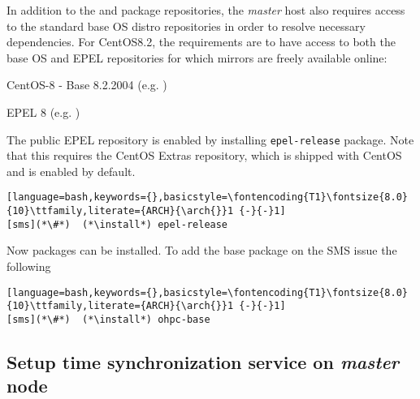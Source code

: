 \documentclass[letterpaper]{article}
\newcommand{\baseOS}{CentOS8.2}
\newcommand{\arch}{x86\_64}
\newcommand{\install}{yum -y install}
\begin{document}


In addition to the \OHPC{} and \xCAT{} package repositories, the {\em master} host also
requires access to the standard base OS distro repositories in order to resolve
necessary dependencies. For \baseOS{}, the requirements are to have access to
both the base OS and EPEL repositories for which mirrors are freely available online:

\begin{itemize*}
\item CentOS-8 - Base 8.2.2004
  (e.g. \href{http://mirror.centos.org/centos-8/8/BaseOS/x86\_64/os}
             {\color{blue}{http://mirror.centos.org/centos-8/8/BaseOS/x86\_64/os}} )
\item EPEL 8 (e.g. \href{http://download.fedoraproject.org/pub/epel/8/Everything/x86\_64}
                        {\color{blue}{http://download.fedoraproject.org/pub/epel/8/Everything/x86\_64}} )
\end{itemize*}

\noindent The public EPEL repository is enabled by installing
\texttt{epel-release} package. Note that this requires the CentOS Extras
repository, which is shipped with CentOS and is enabled by default.

\begin{lstlisting}[language=bash,keywords={},basicstyle=\fontencoding{T1}\fontsize{8.0}{10}\ttfamily,literate={ARCH}{\arch{}}1 {-}{-}1]
[sms](*\#*)  (*\install*) epel-release
\end{lstlisting}

Now \OHPC{} packages can be installed. To add the base package on the SMS
issue the following
\begin{lstlisting}[language=bash,keywords={},basicstyle=\fontencoding{T1}\fontsize{8.0}{10}\ttfamily,literate={ARCH}{\arch{}}1 {-}{-}1]
[sms](*\#*)  (*\install*) ohpc-base
\end{lstlisting}





\subsection{Setup time synchronization service on {\em master} node} \label{sec:add_ntp}

\end{document}
